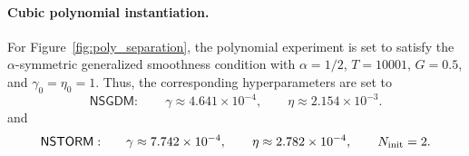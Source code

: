 \documentclass[letter,11pt]{article}
\begin{document}
\paragraph{Cubic polynomial instantiation.}
For Figure~\ref{fig:poly_separation}, the polynomial experiment is set to satisfy the $\alpha$-symmetric generalized smoothness condition with \(\alpha=1/2\), \(T=10001\), \(G=0.5\), and \(\gamma_0=\eta_0=1\). Thus, the corresponding hyperparameters are set to
\[
    \mathsf{NSGDM:} \qquad \gamma \approx 4.641\times 10^{-4},
    \qquad
    \eta \approx 2.154\times 10^{-3}.
\]
and
\[
    \mathsf{NSTORM:} \qquad \gamma \approx 7.742\times 10^{-4},
    \qquad
    \eta \approx 2.782\times 10^{-4},
    \qquad
    N_{\rm init}=2.
\]
\end{document}
